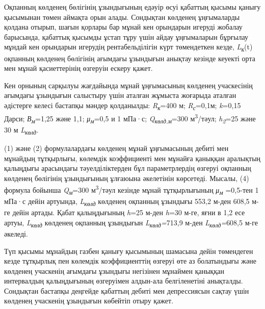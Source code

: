 Оқпанның көлденең бөлігінің ұзындығының едәуір өсуі қабаттың қысымы
қанығу қысымынан төмен аймақта орын алады. Сондықтан көлденең
ұңғымаларды қолдана отырып, шағын қорлары бар мұнай кен орындарын
игеруді жобалау барысында, қабаттық қысымды ұстап тұру үшін айдау
ұңғымаларын бұрғылау мұндай кен орындарын игерудің рентабельділігін күрт
төмендеткен кезде, \emph{L}\textsubscript{к}(t) оқпанның көлденең
бөлігінің ағымдағы ұзындығын анықтау кезінде кеуекті орта мен мұнай
қасиеттерінің өзгеруін ескеру қажет.

Кен орнының сарқылуы жағдайында мұнай ұңғымасының көлденең учаскесінің
ағымдағы ұзындығын салыстыру үшін аталған жұмыста жоғарыда аталған
әдістерге келесі бастапқы мәндер қолданылды:
\emph{R\textsubscript{к}}=400 м; \emph{R\textsubscript{с}}=0,1м;
\emph{k}=0,15 Дарси; \emph{В\textsubscript{м}}=1,25 және 1,1;
\emph{μ\textsubscript{м}}=0,5 и 1 мПа·с;
\emph{Q\textsubscript{көлд.м}}=300 м\textsuperscript{3}/тәул;
\emph{h\textsubscript{2}}=25 және 30 м \emph{L\textsubscript{көлд}.}

(1) және (2) формулалардағы көлденең мұнай ұңғымасының дебиті мен
мұнайдың тұтқырлығы, көлемдік коэффициенті мен мұнайға қаныққан
аралықтың қалыңдығы арасындағы тәуелділіктерден бұл параметрлердің
өзгеруі оқпанның көлденең бөлігінің ұзындығының ұлғаюына әкелетінін
көрсетеді. Мысалы, (4) формула бойынша \emph{Q\textsubscript{м}}=300
м\textsuperscript{3}/тәул кезінде мұнай тұтқырлығының
\emph{μ\textsubscript{м}} =0,5-тен 1 мПа·с дейін артуында,
\emph{L\textsubscript{көлд }}көлденең оқпанның ұзындығы 553,2 м-ден
608,5 м-ге дейін артады. Қабат қалыңдығының \emph{h}=25 м-ден
\emph{h}=30 м-ге, яғни в 1,2 есе артуы, \emph{L\textsubscript{көлд}}
көлденең оқпанның ұзындығын \emph{L\textsubscript{көлд}=}713,9 м-ден
\emph{L\textsubscript{көлд}=}608,5 м-ге әкеледі.

Түп қысымы мұнайдың газбен қанығу қысымының шамасына дейін төмендеген
кезде тұтқырлық пен көлемдік коэффициенттің өзгеруі өте аз болатындығы
және көлденең учаскенің ағымдағы ұзындығы негізінен мұнаймен қаныққан
интервалдың қалыңдығының өзгеруімен алдын-ала белгіленетіні анықталды.
Сондықтан бастапқы деңгейде қабаттың дебиті мен депрессиясын сақтау үшін
көлденең учаскенің ұзындығын көбейтіп отыру қажет.

